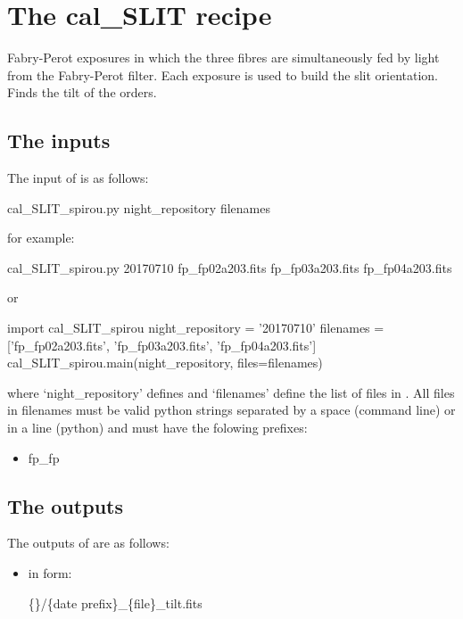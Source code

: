 \clearpage
\newpage
\section{The cal\_SLIT recipe}
\label{ch:the_recipes:cal_SLIT_spirou}

Fabry-Perot exposures in which the three fibres are simultaneously fed by light from the Fabry-Perot filter. Each exposure is used to build the slit orientation. Finds the tilt of the orders. \\

\subsection{The inputs}
The input of {\calSLIT} is as follows:
\begin{cmdbox}
cal_SLIT_spirou.py night_repository filenames
\end{cmdbox}
\noindent for example:
\begin{cmdbox}
cal_SLIT_spirou.py 20170710 fp_fp02a203.fits fp_fp03a203.fits fp_fp04a203.fits
\end{cmdbox}
\noindent or
\begin{pythonbox}
import cal_SLIT_spirou
night_repository = '20170710'
filenames = ['fp_fp02a203.fits', 'fp_fp03a203.fits', 'fp_fp04a203.fits']
cal_SLIT_spirou.main(night_repository, files=filenames)
\end{pythonbox}

\noindent where `night\_repository' defines \argnightname and `filenames' define the list of files in \argfilenames. All files in filenames must be valid python strings separated by a space (command line) or in a line (python) and must have the folowing prefixes:
\begin{itemize}
	\item fp\_fp
\end{itemize}

\subsection{The outputs}
The outputs of \calSLIT are as follows:

\begin{itemize}
\item {} in form:
\begin{tcustomdir}
\{\reduceddir\}/\{date prefix\}\_\{file\}\_tilt.fits
\end{tcustomdir}

\end{itemize}

